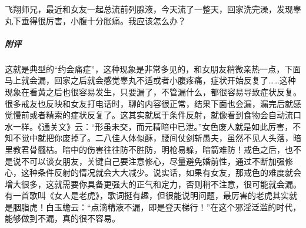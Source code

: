 \begin{case}
    飞翔师兄，最近和女友一起总流前列腺液，今天流了一整天，回家洗完澡，发现睾丸下垂得很厉害，小腹十分胀痛。我应该怎么办？
    \subparagraph{附评} 这就是典型的“约会痛症”，这种现象是非常多见的，和女朋友稍微亲热一点，下面马上就会漏，回家之后就会感觉睾丸不适或者小腹疼痛，症状开始反复了……这种现象在看黄之后也很容易发生，只要漏了，不管漏什么，都很容易导致症状反复。很多戒友也反映和女友打电话时，聊的内容很正常，结果下面也会漏，漏完后就感觉慢前或者精索的症状反复了。这其实就属于条件反射，就像看到食物会自动流口水一样。《通关文》云：“形虽未交，而元精暗中已泄。”女色废人就是如此厉害，不知不觉中就把你废掉了。二八佳人体似酥，腰间仗剑斩愚夫，虽然不见人头落，暗里教君骨髓枯。暗中的伤害往往防不胜防，明枪易躲，暗箭难防！戒色之后，也不是说不可以谈女朋友，关键自己要注意修心，尽量避免婚前性，通过不断加强修心，这种条件反射的情况就会大大减少。说实话，如果有女友，那戒色的难度就会增大很多，这就需要你具备更强大的正气和定力，否则稍不注意，很可能就会漏。有一首歌叫《女人是老虎》，歌词挺有趣，但很能说明问题，最厉害的老虎其实就是胭脂虎！白玉蟾云：“点滴精液不漏，即是登天梯行！”在这个邪淫泛滥的时代，能够做到不漏，真的很不容易。
\end{case}

